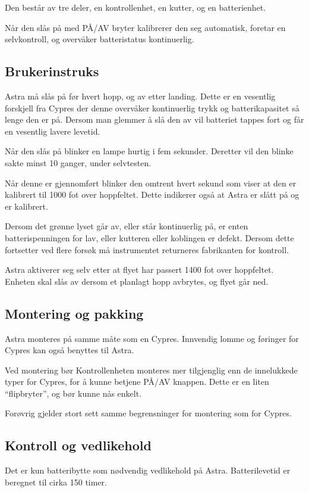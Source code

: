 Den består av tre deler, en kontrollenhet, en kutter, og en batterienhet.

Når den slås på med PÅ/AV bryter kalibrerer den seg automatisk, foretar en selvkontroll, og overvåker batteristatus kontinuerlig.

\subsection{Brukerinstruks}
Astra må slås på før hvert hopp, og av etter landing. Dette er en vesentlig forskjell fra Cypres der denne overvåker kontinuerlig trykk og batterikapasitet så lenge den er på. Dersom man glemmer å slå den av vil batteriet tappes fort og får en vesentlig lavere levetid.

Når den slås på blinker en lampe hurtig i fem sekunder. Deretter vil den blinke sakte minst 10 ganger, under selvtesten.

Når denne er gjennomført blinker den omtrent hvert sekund som viser at den er kalibrert til 1000 fot over hoppfeltet. Dette indikerer også at Astra er slått på og er kalibrert.

Dersom det grønne lyset går av, eller står kontinuerlig på, er enten batterispenningen for lav, eller kutteren eller koblingen er defekt. Dersom dette fortsetter ved flere forsøk må instrumentet returneres fabrikanten for kontroll.

Astra aktiverer seg selv etter at flyet har passert 1400 fot over hoppfeltet. Enheten skal slås av dersom et planlagt hopp avbrytes, og flyet går ned.

\subsection{Montering og pakking}
Astra monteres på samme måte som en Cypres. Innvendig lomme og føringer for Cypres kan også benyttes til Astra.

Ved montering bør Kontrollenheten monteres mer tilgjenglig enn de innelukkede typer for Cypres, for å kunne betjene PÅ/AV knappen. Dette er en liten ``flipbryter'', og bør kunne nås enkelt.

Forøvrig gjelder stort sett samme begrensninger for montering som for Cypres.

\subsection{Kontroll og vedlikehold}
Det er kun batteribytte som nødvendig vedlikehold på Astra. Batterilevetid er beregnet til cirka 150 timer.

